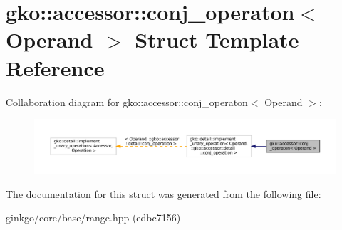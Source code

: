 \hypertarget{structgko_1_1accessor_1_1conj__operaton}{}\section{gko\+:\+:accessor\+:\+:conj\+\_\+operaton$<$ Operand $>$ Struct Template Reference}
\label{structgko_1_1accessor_1_1conj__operaton}


Collaboration diagram for gko\+:\+:accessor\+:\+:conj\+\_\+operaton$<$ Operand $>$\+:
\nopagebreak
\begin{figure}[H]
\begin{center}
\leavevmode
\includegraphics[width=350pt]{structgko_1_1accessor_1_1conj__operaton__coll__graph}
\end{center}
\end{figure}


The documentation for this struct was generated from the following file\+:\begin{DoxyCompactItemize}
\item 
ginkgo/core/base/range.\+hpp (edbc7156)\end{DoxyCompactItemize}
